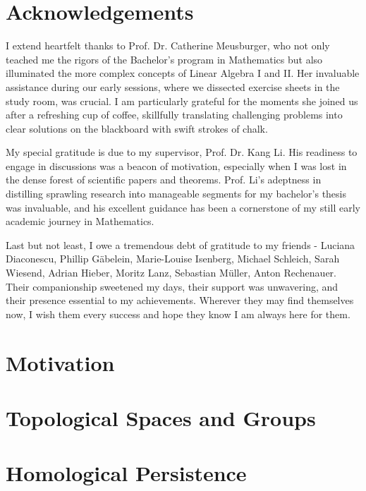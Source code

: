 \documentclass[b5paper, 12pt, twoside]{report}
\begin{document}
	\chapter*{Acknowledgements}

	I extend heartfelt thanks to Prof. Dr. Catherine Meusburger, who not only teached me the rigors of the Bachelor's program in Mathematics but also illuminated the more complex concepts of Linear Algebra I and II. Her invaluable assistance during our early sessions, where we dissected exercise sheets in the study room, was crucial. I am particularly grateful for the moments she joined us after a refreshing cup of coffee, skillfully translating challenging problems into clear solutions on the blackboard with swift strokes of chalk. 

My special gratitude is due to my supervisor, Prof. Dr. Kang Li. His readiness to engage in discussions was a beacon of motivation, especially when I was lost in the dense forest of scientific papers and theorems. Prof. Li's adeptness in distilling sprawling research into manageable segments for my bachelor's thesis was invaluable, and his excellent guidance has been a cornerstone of my still early academic journey in Mathematics.

Last but not least, I owe a tremendous debt of gratitude to my friends - Luciana Diaconescu, Phillip Gäbelein, Marie-Louise Isenberg, Michael Schleich, Sarah Wiesend, Adrian Hieber, Moritz Lanz, Sebastian Müller, Anton Rechenauer. Their companionship sweetened my days, their support was unwavering, and their presence essential to my achievements. Wherever they may find themselves now, I wish them every success and hope they know I am always here for them.

	\newpage
	\tableofcontents

	\singlespacing
	\chapter{Motivation}
	

	\chapter{Topological Spaces and Groups}
	

	\chapter{Homological Persistence}
	

	\singlespacing
	\printbibliography

	\newpage
	\printindex
\end{document}
